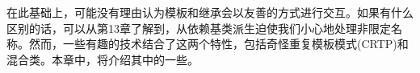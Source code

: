 在此基础上，可能没有理由认为模板和继承会以友善的方式进行交互。如果有什么区别的话，可以从第13章了解到，从依赖基类派生迫使我们小心地处理非限定名称。然而，一些有趣的技术结合了这两个特性，包括奇怪重复模板模式(CRTP)和混合类。本章中，将介绍其中的一些。